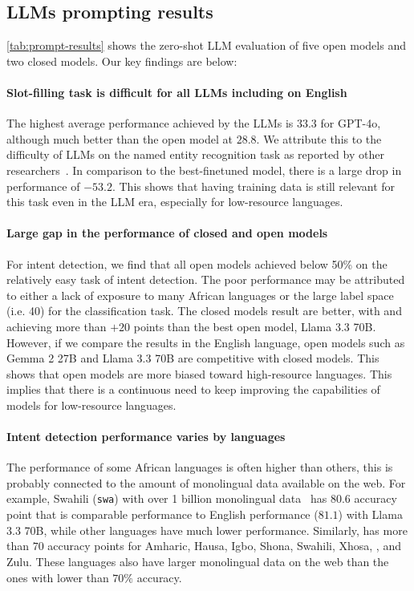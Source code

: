 \subsection{LLMs prompting results}
\autoref{tab:prompt-results} shows the zero-shot LLM evaluation of five open models and two closed models. Our key findings are below: 

\paragraph{Slot-filling task is difficult for all LLMs including on English} The highest average performance achieved by the LLMs is $33.3$ for GPT-4o, although much better than the open model at $28.8$. We attribute this to the difficulty of LLMs on the named entity recognition task as reported by other researchers~\cite{Yu2023OpenCO, Ojo2023HowGA}. In comparison to the best-finetuned model, there is a large drop in performance of $-53.2$. This shows that having training data is still relevant for this task even in the LLM era, especially for low-resource languages. 

\paragraph{Large gap in the performance of closed and open models} For intent detection, we find that all open models achieved below 50\% on the relatively easy task of intent detection. The poor performance may be attributed to either a lack of exposure to many African languages or the large label space (i.e. 40) for the classification task. The closed models result are better, with \gpto and \gemini achieving more than $+20$ points than the best open model, Llama 3.3 70B. However, if we compare the results in the English language, open models such as Gemma 2 27B and Llama 3.3 70B are competitive with closed models. This shows that open models are more biased toward high-resource languages. This implies that there is a continuous need to keep improving the capabilities of models for low-resource languages. 

\paragraph{Intent detection performance varies by languages} The performance of some African languages is often higher than others, this is probably connected to the amount of monolingual data available on the web. For example, Swahili (\texttt{swa}) with over 1 billion monolingual data~\citep{kudugunta2023madlad} has $80.6$ accuracy point that is comparable performance to English performance ($81.1$) with Llama 3.3 70B, while other languages have much lower performance. Similarly, \gpto has more than $70$ accuracy points for Amharic, Hausa, Igbo, Shona, Swahili, Xhosa, \yoruba, and Zulu. These languages also have larger monolingual data on the web than the ones with lower than $70\%$ accuracy. 


